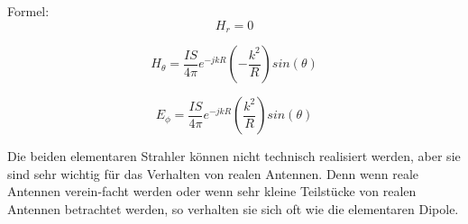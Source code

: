 Formel:
\begin{equation}
H_r= 0
\end{equation}

\begin{equation}
H_\theta= \frac{I S}{4\pi}   e^{-jkR} \left(- \frac{k^{2}}{R}   \right) sin(\theta)
\end{equation}

\begin{equation}
E_\phi= \frac{I S}{4\pi}   e^{-jkR} \left( \frac{k^{2}}{R}   \right) sin(\theta)
\end{equation}

Die beiden elementaren Strahler können nicht technisch realisiert werden, aber sie sind sehr wichtig für das Verhalten von realen Antennen. Denn wenn reale Antennen verein-facht werden oder wenn sehr kleine Teilstücke von realen Antennen betrachtet werden, so verhalten sie sich oft wie die elementaren Dipole. \\

